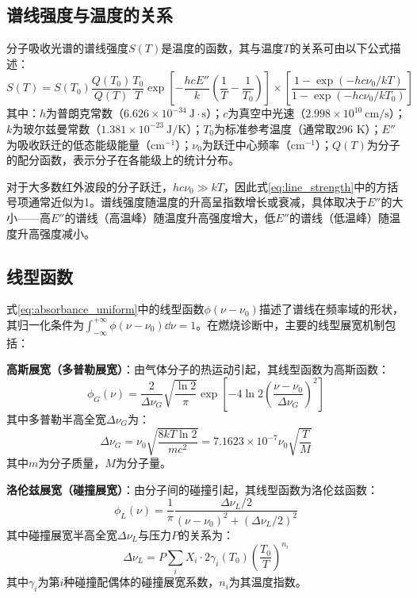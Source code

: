 \subsection{谱线强度与温度的关系}

分子吸收光谱的谱线强度$S(T)$是温度的函数，其与温度$T$的关系可由以下公式描述：
\begin{equation}
	S(T) = S(T_0) \frac{Q(T_0)}{Q(T)} \frac{T_0}{T} \exp\left[-\frac{hc E''}{k}\left(\frac{1}{T} - \frac{1}{T_0}\right)\right] \times \left[\frac{1-\exp(-hc\nu_0/kT)}{1-\exp(-hc\nu_0/kT_0)}\right]
	\label{eq:line_strength}
\end{equation}
其中：$h$为普朗克常数（$6.626 \times 10^{-34}~\text{J}\cdot\text{s}$）；$c$为真空中光速（$2.998 \times 10^{10}~\text{cm/s}$）；$k$为玻尔兹曼常数（$1.381 \times 10^{-23}~\text{J/K}$）；$T_0$为标准参考温度（通常取296 K）；$E''$为吸收跃迁的低态能级能量（cm$^{-1}$）；$\nu_0$为跃迁中心频率（cm$^{-1}$）；$Q(T)$为分子的配分函数，表示分子在各能级上的统计分布。

对于大多数红外波段的分子跃迁，$hc\nu_0 \gg kT$，因此式\eqref{eq:line_strength}中的方括号项通常近似为1。谱线强度随温度的升高呈指数增长或衰减，具体取决于$E''$的大小——高$E''$的谱线（高温峰）随温度升高强度增大，低$E''$的谱线（低温峰）随温度升高强度减小。

\subsection{线型函数}

式\eqref{eq:absorbance_uniform}中的线型函数$\phi(\nu - \nu_0)$描述了谱线在频率域的形状，其归一化条件为$\int_{-\infty}^{+\infty} \phi(\nu - \nu_0) \dd\nu = 1$。在燃烧诊断中，主要的线型展宽机制包括：

\textbf{高斯展宽（多普勒展宽）}：由气体分子的热运动引起，其线型函数为高斯函数：
\begin{equation}
	\phi_G(\nu) = \frac{2}{\Delta \nu_G} \sqrt{\frac{\ln 2}{\pi}} \exp\left[-4\ln 2 \left(\frac{\nu - \nu_0}{\Delta \nu_G}\right)^2\right]
	\label{eq:gaussian}
\end{equation}
其中多普勒半高全宽$\Delta \nu_G$为：
\begin{equation}
	\Delta \nu_G = \nu_0 \sqrt{\frac{8kT \ln 2}{mc^2}} = 7.1623 \times 10^{-7} \nu_0 \sqrt{\frac{T}{M}}
	\label{eq:doppler_width}
\end{equation}
其中$m$为分子质量，$M$为分子量。

\textbf{洛伦兹展宽（碰撞展宽）}：由分子间的碰撞引起，其线型函数为洛伦兹函数：
\begin{equation}
	\phi_L(\nu) = \frac{1}{\pi} \frac{\Delta \nu_L/2}{(\nu - \nu_0)^2 + (\Delta \nu_L/2)^2}
	\label{eq:lorentzian}
\end{equation}
其中碰撞展宽半高全宽$\Delta \nu_L$与压力$P$的关系为：
\begin{equation}
	\Delta \nu_L = P \sum_i X_i \cdot 2\gamma_{i}(T_0) \left(\frac{T_0}{T}\right)^{n_i}
	\label{eq:lorentz_width}
\end{equation}
其中$\gamma_i$为第$i$种碰撞配偶体的碰撞展宽系数，$n_i$为其温度指数。

